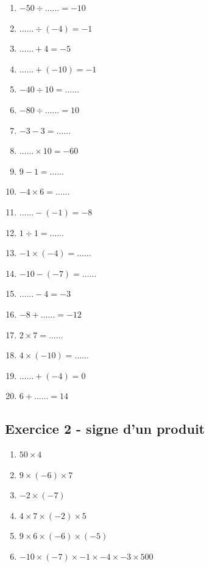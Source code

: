 \begin{multicols}{3}\noindent
    \begin{enumerate}
        \item $-50 \div \ldots\ldots = -10$
        \item $\ldots\ldots \div \left( -4\right) = -1$
        \item $\ldots\ldots + 4 = -5$
        \item $\ldots\ldots + \left( -10\right) = -1$
        \item $-40 \div 10 = \ldots\ldots$
        \item $-80 \div \ldots\ldots = 10$
        \item $-3 - 3 = \ldots\ldots$
        \item $\ldots\ldots \times 10 = -60$
        \item $9 - 1 = \ldots\ldots$
        \item $-4 \times 6 = \ldots\ldots$
        \item $\ldots\ldots - \left( -1\right) = -8$
        \item $1 \div 1 = \ldots\ldots$
        \item $-1 \times \left( -4\right) = \ldots\ldots$
        \item $-10 - \left( -7\right) = \ldots\ldots$
        \item $\ldots\ldots - 4 = -3$
        \item $-8 + \ldots\ldots = -12$
        \item $2 \times 7 = \ldots\ldots$
        \item $4 \times \left( -10\right) = \ldots\ldots$
        \item $\ldots\ldots + \left( -4\right) = 0$
        \item $6 + \ldots\ldots = 14$
    \end{enumerate}
  \end{multicols}

\subsection*{Exercice 2 - signe d'un produit}

\begin{enumerate}
        \item $50 \times 4$ \dotfill
        \item $9 \times (-6) \times 7$ \dotfill
        \item $-2 \times (-7)$ \dotfill
        \item $4 \times 7 \times (-2) \times 5$ \dotfill
        \item $9 \times 6 \times (-6) \times (-5)$ \dotfill
        \item $-10 \times (-7) \times -1 \times - 4 \times -3 \times 500$ \dotfill
\end{enumerate}

